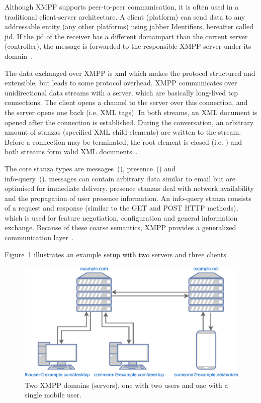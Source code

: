 Although XMPP supports peer-to-peer communication, it is often used in a traditional client-server architecture.
A client (\gls{platform}) can send data to any addressable entity (any other \glspl{platform}) using \Gls{jabber} Identifiers, hereafter called \gls{jid}. If the \gls{jid} of the receiver has a different domainpart than the current server (\gls{controller}), the message is forwarded to the responsible XMPP server under its domain~\cite{rfc6120}.

The data exchanged over XMPP is \gls{xml} which makes the protocol structured and extensible, but leads to some protocol overhead.
XMPP communicates over unidirectional data streams with a server, which are basically long-lived \gls{tcp} connections.
The client opens a channel to the server over this connection, and the server opens one back (i.e.  XML tags). In both streams, an XML document is opened after the connection is established.
During the conversation, an arbitrary amount of \glspl{stanza} (specified XML child elements) are written to the stream.
Before a connection may be terminated, the root element is closed (i.e. ) and both streams form valid XML documents~\cite{rfc6120}\cite{professional-xmpp}.

The core \gls{stanza} types are \glspl{message}~(), \gls{presence}~() and\\
\gls{info-query}~().
\Glspl{message} can contain arbitrary data similar to email but are optimised for immediate delivery.
\Gls{presence} \glspl{stanza} deal with network availability and the propagation of user presence information.
An \gls{info-query} \gls{stanza} consists of a request and response (similar to the GET and POST HTTP methods), which is used for feature negotiation, configuration and general information exchange.
Because of these coarse semantics, XMPP provides a generalized communication layer~\cite{rfc6120}\cite{ieee-xplore-stream-xml-xmpp}.

Figure~\ref{fig:xmpp-overview} illustrates an example setup with two servers and three clients.

\begin{figure}[h]
	\centering
	\includegraphics[width=0.8\linewidth]{resources/xmpp_overview.pdf}
	\caption{Two XMPP domains (servers), one with two users and one with a single mobile user.}
	\label{fig:xmpp-overview}
\end{figure}

